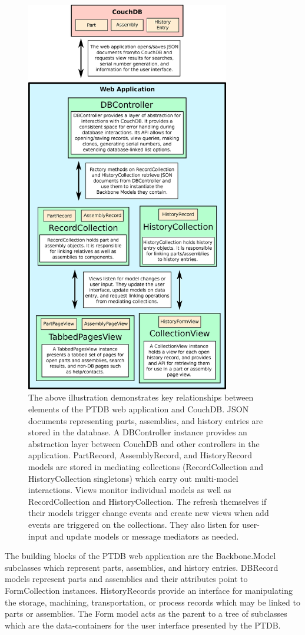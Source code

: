\documentclass[journal]{IEEEtran}
\begin{document}
\begin{figure}[!t]
\centering
\includegraphics[width=3.5in]{simple_structure}
\caption{The above illustration demonstrates key relationships between elements of the PTDB web application
and CouchDB. JSON documents representing parts, assemblies, and history entries are stored in the database.
A DBController instance provides an abstraction layer between CouchDB and other controllers in the application.
PartRecord, AssemblyRecord, and HistoryRecord models are stored in mediating collections (RecordCollection and HistoryCollection
singletons) which carry out multi-model interactions. Views monitor individual models as well as RecordCollection and HistoryCollection.
The refresh themselves if their models trigger change events and create new views when add events are triggered
on the collections. They also listen for user-input and update models or message mediators as needed.}
\label{simple_structure}
\end{figure}

The building blocks of the PTDB web application are the Backbone.Model subclasses which represent parts, 
assemblies, and history entries. DBRecord models represent parts
and assemblies and their attributes point to FormCollection instances. HistoryRecords provide an interface for manipulating 
the storage, machining, transportation, or process records which may be linked to parts or assemblies. The Form model
acts as the parent to a tree of subclasses which are the data-containers for the user interface presented by the PTDB.
\end{document}
